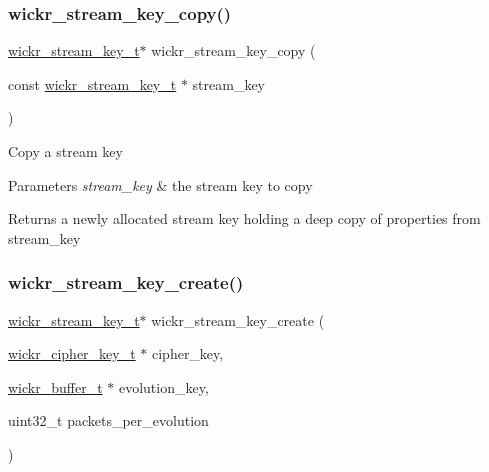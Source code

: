 \subsubsection{\texorpdfstring{wickr\+\_\+stream\+\_\+key\+\_\+copy()}{wickr\_stream\_key\_copy()}}
{\footnotesize\ttfamily \hyperlink{structwickr__stream__key}{wickr\+\_\+stream\+\_\+key\+\_\+t}$\ast$ wickr\+\_\+stream\+\_\+key\+\_\+copy (\begin{DoxyParamCaption}\item[{const \hyperlink{structwickr__stream__key}{wickr\+\_\+stream\+\_\+key\+\_\+t} $\ast$}]{stream\+\_\+key }\end{DoxyParamCaption})}

Copy a stream key


\begin{DoxyParams}{Parameters}
{\em stream\+\_\+key} & the stream key to copy \\
\hline
\end{DoxyParams}
\begin{DoxyReturn}{Returns}
a newly allocated stream key holding a deep copy of properties from \textquotesingle{}stream\+\_\+key\textquotesingle{} 
\end{DoxyReturn}
\mbox{\label{group__wickr__stream_ga54449667a25d9e64cd04dae58dd76418}} 
\subsubsection{\texorpdfstring{wickr\+\_\+stream\+\_\+key\+\_\+create()}{wickr\_stream\_key\_create()}}
{\footnotesize\ttfamily \hyperlink{structwickr__stream__key}{wickr\+\_\+stream\+\_\+key\+\_\+t}$\ast$ wickr\+\_\+stream\+\_\+key\+\_\+create (\begin{DoxyParamCaption}\item[{\hyperlink{structwickr__cipher__key}{wickr\+\_\+cipher\+\_\+key\+\_\+t} $\ast$}]{cipher\+\_\+key,  }\item[{\hyperlink{structwickr__buffer}{wickr\+\_\+buffer\+\_\+t} $\ast$}]{evolution\+\_\+key,  }\item[{uint32\+\_\+t}]{packets\+\_\+per\+\_\+evolution }\end{DoxyParamCaption})}

